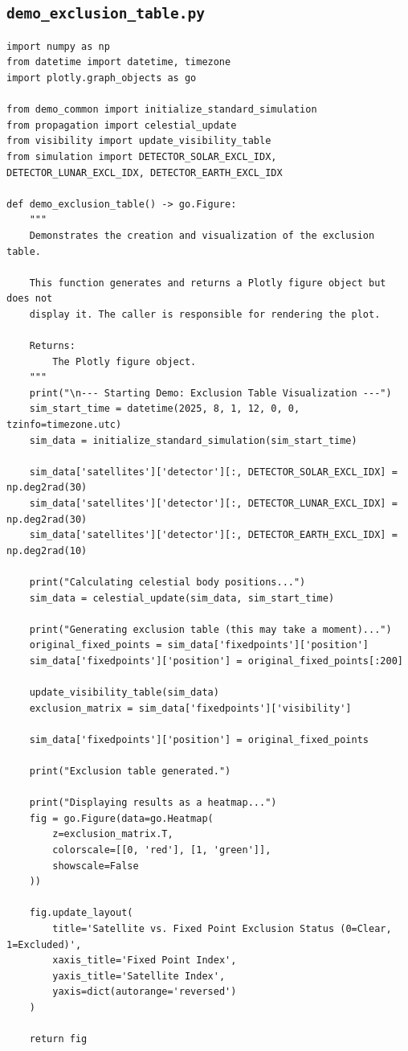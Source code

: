 \documentclass[11pt]{article}
\begin{document}
\subsection{\texttt{demo\_exclusion\_table.py}}
\begin{Verbatim}
import numpy as np
from datetime import datetime, timezone
import plotly.graph_objects as go

from demo_common import initialize_standard_simulation
from propagation import celestial_update
from visibility import update_visibility_table
from simulation import DETECTOR_SOLAR_EXCL_IDX, DETECTOR_LUNAR_EXCL_IDX, DETECTOR_EARTH_EXCL_IDX

def demo_exclusion_table() -> go.Figure:
    """
    Demonstrates the creation and visualization of the exclusion table.

    This function generates and returns a Plotly figure object but does not
    display it. The caller is responsible for rendering the plot.

    Returns:
        The Plotly figure object.
    """
    print("\n--- Starting Demo: Exclusion Table Visualization ---")
    sim_start_time = datetime(2025, 8, 1, 12, 0, 0, tzinfo=timezone.utc)
    sim_data = initialize_standard_simulation(sim_start_time)

    sim_data['satellites']['detector'][:, DETECTOR_SOLAR_EXCL_IDX] = np.deg2rad(30)
    sim_data['satellites']['detector'][:, DETECTOR_LUNAR_EXCL_IDX] = np.deg2rad(30)
    sim_data['satellites']['detector'][:, DETECTOR_EARTH_EXCL_IDX] = np.deg2rad(10)

    print("Calculating celestial body positions...")
    sim_data = celestial_update(sim_data, sim_start_time)

    print("Generating exclusion table (this may take a moment)...")
    original_fixed_points = sim_data['fixedpoints']['position']
    sim_data['fixedpoints']['position'] = original_fixed_points[:200]

    update_visibility_table(sim_data)
    exclusion_matrix = sim_data['fixedpoints']['visibility']

    sim_data['fixedpoints']['position'] = original_fixed_points

    print("Exclusion table generated.")

    print("Displaying results as a heatmap...")
    fig = go.Figure(data=go.Heatmap(
        z=exclusion_matrix.T,
        colorscale=[[0, 'red'], [1, 'green']],
        showscale=False
    ))

    fig.update_layout(
        title='Satellite vs. Fixed Point Exclusion Status (0=Clear, 1=Excluded)',
        xaxis_title='Fixed Point Index',
        yaxis_title='Satellite Index',
        yaxis=dict(autorange='reversed')
    )

    return fig
\end{Verbatim}
\end{document}
